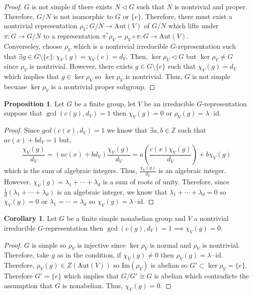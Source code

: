\documentclass[12pt]{extarticle}
\newcommand{\Z}{\mathbb{Z}}
\newcommand{\sm}{\! \setminus \!}
\renewcommand{\Im}[1]{\mathrm{Im}(#1)}
\newcommand{\id}{\mathrm{id}}
\newcommand{\aut}[1]{\mathrm{Aut}\left( #1 \right)}
\theoremstyle{definition}
\newtheorem{proposition}[theorem]{Proposition}
\newtheorem{corollary}[theorem]{Corollary}
\begin{document}
\begin{proof}
$G$ is not simple if there exists $N \triangleleft G$ such that $N$ is nontrivial and proper. Therefore, $G/N$ is not isomorphic to $G$ or $\{e\}$. Therefore, there must exist a nontrivial representation $\rho_V : G/N \to \aut{V}$ of $G/N$ which lifts under $\pi : G \to G/N$ to a representation $\pi^* \rho_V = \rho_V \circ \pi : G \to \aut{V}$. \bigskip\\
Converseley, choose $\rho_V$ which is a nontrivial irreducible $G$-representation such that $\exists g \in G \sm \{e\} : \chi_V(g) = \chi_V(e) = d_V$. Then, $\ker{\rho_V} \triangleleft G$ but $\ker{\rho_V} \neq G$ since $\rho_V$ is nontrivial. However, there exists $g \in G \sm \{e\}$ such that $\chi_V(g) = d_V$ which implies that $g \in \ker{\rho_V}$ so $\ker{\rho_V}$ is nontrivial. Thus, $G$ is not simple becuase $\ker{\rho_V}$ is a nontrivial proper subgroup. 
\end{proof}

\begin{proposition}
Let $G$ be a finite group, let $V$ be an irreducible $G$-representation suppose that $\gcd{(c(g), d_V)} = 1$ then $\chi_V(g) = 0$ or $\rho_V(g) = \lambda \cdot \id$.
\end{proposition}

\begin{proof}
Since $gcd{(c(x), d_V)} = 1$ we know that $\exists a, b \in \Z$ such that $a c(x) + b d_V = 1$ but,
\[\frac{\chi_V(g)}{d_V} = (a c(x) + b d_V) \frac{\chi_V(g)}{d_V} = a \left( \frac{c(x) \chi_V(g)}{d_V} \right) + b \chi_V(g)\]
which is the sum of algebraic integers. Thus, $\frac{\chi_V(g)}{d_V}$ is an algebraic integer. However, $\chi_V(g) = \lambda_1 + \cdots + \lambda_d$ is a sum of roots of unity. Therefore, since $\frac{1}{d}(\lambda_1 + \cdots + \lambda_d)$ is an algebraic integer, we know that $\lambda_1 + \cdots + \lambda_d = 0$ so $\chi_V(g) = 0$ or $\lambda_1 = \cdots = \lambda_d$ so $\chi_V(g) = \lambda \cdot \id$. 
\end{proof}

\begin{corollary}
Let $G$ be a finite simple nonabelian group and $V$ a nontrivial irreducible $G$-representation then $\gcd{(c(g), d_V)} = 1 \implies \chi_V(g) =0$.
\end{corollary}

\begin{proof}
$G$ is simple so $\rho_V$ is injective since $\ker{\rho_V}$ is normal and $\rho_V$ is nontrivial. Therefore, take $g$ as in the condition, if $\chi_V(g) \neq 0$ then $\rho_V(g) = \lambda \cdot \id$. Therefore, $\rho_V(g) \in Z(\aut{V})$ so $\Im{\rho_V}$ is abelian so $G' \subset \ker{\rho_V} = \{e\}$. Therefore $G' = \{e\}$ which implies that $G/G' \cong G$ is abelian which contradicts the assumption that $G$ is nonabelian. Thus, $\chi_V(g) = 0$. 
\end{proof}
\end{document}
